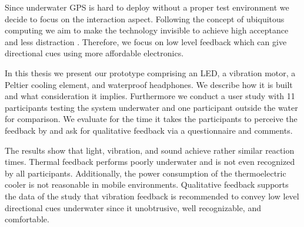 Since underwater GPS is hard to deploy without a proper test environment we decide to focus on the interaction aspect.
Following the concept of ubiquitous computing we aim to make the technology invisible to achieve high acceptance and less distraction \citep{Weiser:1993:CSI:159544.159617}.
Therefore, we focus on low level feedback which can give directional cues using more affordable electronics.

In this thesis we present our prototype comprising an LED, a vibration motor, a Peltier cooling element, and waterproof headphones.
We describe how it is built and what consideration it implies.
Furthermore we conduct a user study with 11 participants testing the system underwater and one participant outside the water for comparison.
We evaluate for the time it takes the participants to perceive the feedback by and ask for qualitative feedback via a questionnaire and comments.

The results show that light, vibration, and sound achieve rather similar reaction times.
Thermal feedback performs poorly underwater and is not even recognized by all participants.
Additionally, the power consumption of the thermoelectric cooler is not reasonable in mobile environments.
Qualitative feedback supports the data of the study that vibration feedback is recommended to convey low level directional cues underwater since it unobtrusive, well recognizable, and comfortable.









